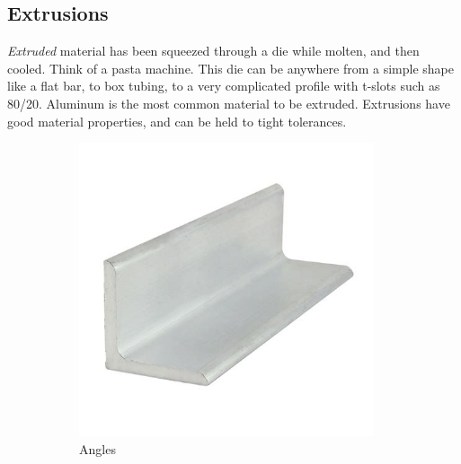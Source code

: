 \documentclass[10pt,letterpaper]{book}
\begin{document}
 \subsection{Extrusions} \label{section:extrusions}
 \textit{Extruded} material has been squeezed through a die while molten, and then cooled. Think of a pasta machine. This die can be anywhere from a simple shape like a flat bar, to box tubing, to a very complicated profile with t-slots such as 80/20. Aluminum is the most common material to be extruded. Extrusions have good material properties, and can be held to tight tolerances.
 
  \begin{figure}[H]
	\begin{subfigure}[b]{.24\linewidth}
		\includegraphics[width=0.95\textwidth]{imgs/extrusion_angle.jpeg}
		\caption{Angles}
	\end{subfigure} \begin{subfigure}[b]{.24\linewidth}

\end{subfigure}
\end{figure}
\end{document}
